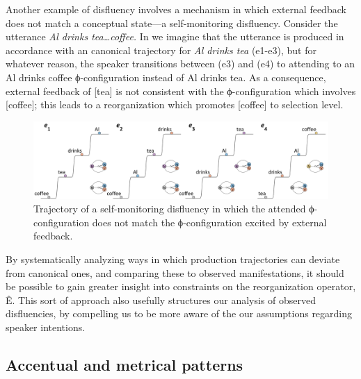   Another example of disfluency involves a mechanism in which external feedback does not match a conceptual state—a self-monitoring disfluency. Consider the utterance \textit{Al drinks tea…coffee.} In {} we imagine that the utterance is produced in accordance with an canonical trajectory for \textit{Al drinks tea} (e1-e3), but for whatever reason, the speaker transitions between (e3) and (e4) to attending to an {\textbar}Al drinks coffee{\textbar} ϕ-configuration instead of {\textbar}Al drinks tea{\textbar}. As a consequence, external feedback of [tea] is not consistent with the ϕ-configuration which involves [coffee]; this leads to a reorganization which promotes [coffee] to selection level.

  
\begin{figure}
\includegraphics[width=\textwidth]{figures/Tilsen-img62.png}
\caption{Trajectory of a self-monitoring disfluency in which the attended ϕ-configuration does not match the ϕ-configuration excited by external feedback.}
\label{fig:4:12}
\end{figure}
 

  By systematically analyzing ways in which production trajectories can deviate from canonical ones, and comparing these to observed manifestations, it should be possible to gain greater insight into constraints on the reorganization operator, Ê. This sort of approach also usefully structures our analysis of observed disfluencies, by compelling us to be more aware of the our assumptions regarding speaker intentions.

\subsection{Accentual and metrical patterns}

